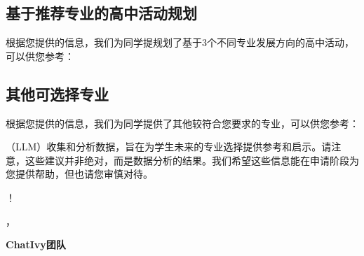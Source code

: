 \documentclass[12pt]{article}
\begin{document}
\begin{CJK*}{UTF8}{gbsn}
   
   
   \subsection*{基于推荐专业的高中活动规划}
   根据您提供的信息，我们为同学提规划了基于3个不同专业发展方向的高中活动，可以供您参考：
   
   
   
   \newpage
   \hspace{0pt}
   \vspace{0cm}
   \subsection*{其他可选择专业}
   根据您提供的信息，我们为同学提供了其他较符合您要求的专业，可以供您参考：

   \bigskip
   \bigskip
   \bigskip
   （LLM）收集和分析数据，旨在为学生未来的专业选择提供参考和启示。请注意，这些建议并非绝对，而是数据分析的结果。我们希望这些信息能在申请阶段为您提供帮助，但也请您审慎对待。

   \bigskip 
   ！

   ，

   \noindent\textbf{ChatIvy团队}

\printbibliography
\clearpage\end{CJK*}
\end{document}
